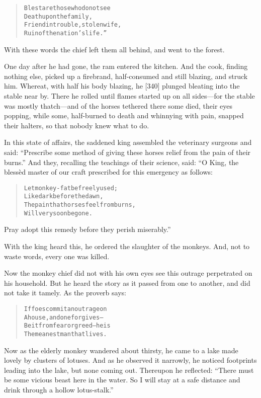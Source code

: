 \documentclass[article, twoside, 14pt]{memoir}
\renewenvironment{verbatim}{%
\begin{quote}%
\vskip -10pt%
\begin{alltt}\normalfont\large}{\end{alltt}%
\end{quote}%
\vskip -10pt
} %
\begin{document}
\begin{verbatim}
Blest are those who do not see
Death upon the family,
Friend in trouble, stolen wife,
Ruin of the nation's life.”
\end{verbatim}
With these words the chief left them all behind, and went to the
forest.

One day after he had gone, the ram entered the kitchen. And the
cook, finding nothing else, picked up a firebrand, half-consumed
and still blazing, and struck him. Whereat, with half his body
blazing, he [340] plunged bleating into the stable near by. There
he rolled until flames started up on all sides---for the stable was
mostly thatch---and of the horses tethered there some died, their
eyes popping, while some, half-burned to death and whinnying with
pain, snapped their halters, so that nobody knew what to do.

In this state of affairs, the saddened king assembled the
veterinary surgeons and said:
``Prescribe some method of giving these horses relief from the pain of their burns.''
And they, recalling the teachings of their science, said: “O King,
the blessèd master of our craft prescribed for this emergency as
follows:

\begin{verbatim}
Let monkey-fat be freely used;
    Like dark before the dawn,
The pain that horses feel from burns,
    Will very soon be gone.
\end{verbatim}
Pray adopt this remedy before they perish miserably.”

With the king heard this, he ordered the slaughter of the monkeys.
And, not to waste words, every one was killed.

Now the monkey chief did not with his own eyes see this outrage
perpetrated on his household. But he heard the story as it passed
from one to another, and did not take it tamely. As the proverb
says:

\begin{verbatim}
If foes commit an outrage on
    A house, and one forgives--
Be it from fear or greed--he is
    The meanest man that lives.
\end{verbatim}
Now as the elderly monkey wandered about thirsty, he came to a lake
made lovely by clusters of lotuses. And as he observed it narrowly,
he noticed footprints leading into the lake, but none coming out.
Thereupon he reflected:
``There must be some vicious beast here in the water. So I will stay at a safe distance and drink through a hollow lotus-stalk.''
\end{document}
